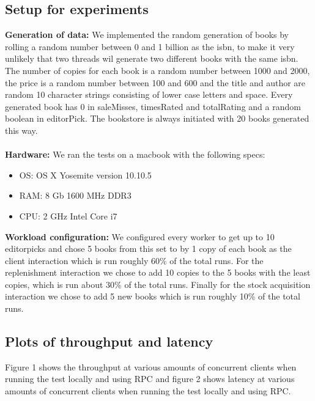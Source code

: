 \documentclass{article}
\theoremstyle{plain}
\theoremstyle{nonumberplain}
\begin{document}
\subsection{Setup for experiments}

\textbf{Generation of data:}
We implemented the random generation of books by rolling a random number between 0 and 1 billion as the isbn, to make it very unlikely that two threads wil generate two different books with the same isbn. The number of copies for each book is a random number between 1000 and 2000, the price is a random number between 100 and 600 and the title and author are random 10 character strings consisting of lower case letters and space. Every generated book has 0 in saleMisses, timesRated and totalRating and a random boolean in editorPick. The bookstore is always initiated with 20 books generated this way.\\\\
\textbf{Hardware:}
We ran the tests on a macbook with the following specs:
\begin{itemize}
	\item OS: OS X Yosemite version 10.10.5
	\item RAM: 8 Gb 1600 MHz DDR3
	\item CPU: 2 GHz Intel Core i7
\end{itemize}
\textbf{Workload configuration:}
We configured every worker to get up to 10 editorpicks and chose 5 books from this set to by 1 copy of each book as the client interaction which is run roughly 60\% of the total runs. For the replenishment interaction we chose to add 10 copies to the 5 books with the least copies, which is run about 30\% of the total runs. Finally for the stock acquisition interaction we chose to add 5 new books which is run roughly 10\% of the total runs.


\subsection{Plots of throughput and latency}

Figure 1 shows the throughput at various amounts of concurrent clients when running the test locally and using RPC and figure 2 shows latency at various amounts of concurrent clients when running the test locally and using RPC.
\end{document}
